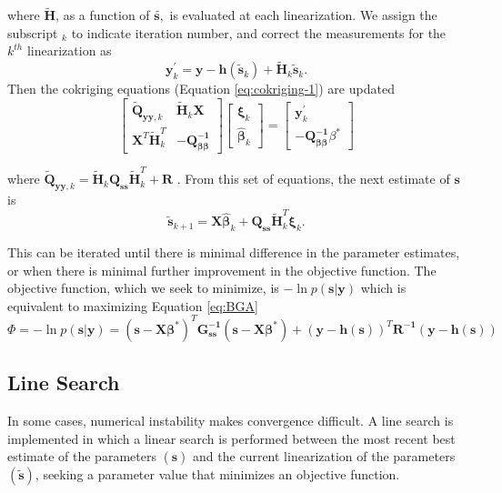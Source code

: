\documentclass[11pt,oneside,onecolumn]{usgsreport}
\begin{document}
\begin{appendix}
where $\mathbf{\tilde{H}}$, as a function of $\mathbf{\tilde{s,}}$
is evaluated at each linearization. We assign the subscript $_{k}$
to indicate iteration number, and correct the measurements for the
$k^{th}$ linearization as 
\[
\mathbf{y}_{k}^{'}=\mathbf{y}-\mathbf{h}(\tilde{\mathbf{s}}_{k})+\tilde{\mathbf{H}}_{k}\tilde{\mathbf{s}}_{k}.
\]
Then the cokriging equations (Equation \ref{eq:cokriging-1}) are
updated
\begin{equation}
\left[\begin{array}{cc}
\tilde{\mathbf{Q}}_{\mathbf{yy},k} & \tilde{\mathbf{H}}_{k}\mathbf{X}\\
\mathbf{X}^{T}\tilde{\mathbf{H}}_{k}^{T} & \mathbf{-}\mathbf{Q_{\beta\beta}^{-1}}
\end{array}\right]\left[\begin{array}{c}
\mathbf{\xi}_{k}\\
\hat{\mathbf{\beta}}_{k}
\end{array}\right]=\left[\begin{array}{c}
\mathbf{y}_{k}^{'}\\
\mathbf{-}\mathbf{Q_{\beta\beta}^{-1}}\beta^{*}
\end{array}\right]\label{eq:iterations-1}
\end{equation}


where $\tilde{\mathbf{Q}}_{\mathbf{yy},k}=\tilde{\mathbf{H}}_{k}\mathbf{Q_{ss}}\tilde{\mathbf{H}}_{k}^{T}+\mathbf{R}$
. From this set of equations, the next estimate of $\mathbf{s}$ is
\[
\tilde{\mathbf{s}}_{k+1}=\mathbf{X\hat{\beta}}_{k}+\mathbf{Q_{ss}}\tilde{\mathbf{H}}_{k}^{T}\mathbf{\xi}_{k}.
\]


This can be iterated until there is minimal difference in the parameter
estimates, or when there is minimal further improvement in the objective
function. The objective function, which we seek to minimize, is $\mathbf{-}\ln p\left(\mathbf{s|y}\right)$
which is equivalent to maximizing Equation \ref{eq:BGA}
\[
\Phi=\mathbf{-}\ln p\left(\mathbf{s|y}\right)=(\mathbf{s-X\beta}^{*})^{T}\mathbf{G_{\mathbf{ss}}^{-1}}(\mathbf{s-X\beta^{*}})+\left(\mathbf{y-h}(\mathbf{s})\right)^{T}\mathbf{R^{-1}\left(\mathbf{y-h}(\mathbf{s})\right)}
\]



\subsection{Line Search}

In some cases, numerical instability makes convergence difficult.
A line search is implemented in which a linear search is performed
between the most recent best estimate of the parameters $\left(\mathbf{\hat{s}}\right)$
and the current linearization of the parameters $\left(\mathbf{\widetilde{\mathbf{s}}}\right)$,
seeking a parameter value that minimizes an objective function. 


\end{appendix}
\end{document}
